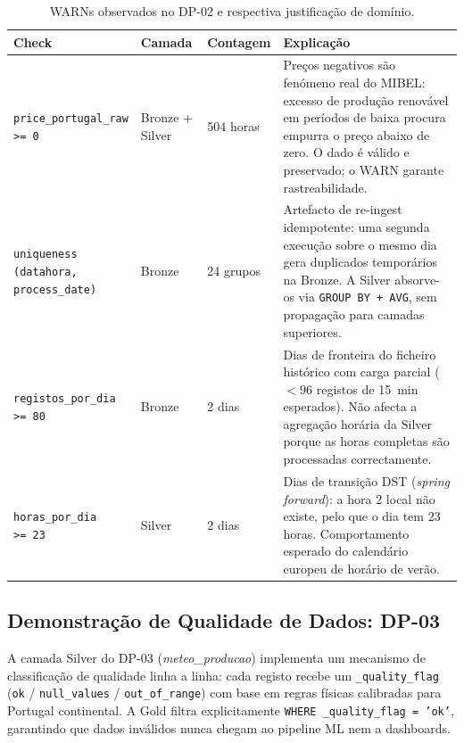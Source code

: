 \documentclass[11pt,a4paper]{article}
\begin{document}
\begin{table}[htbp]
\centering
\scriptsize
\begin{tabular}{p{3.7cm}p{1.8cm}p{1.5cm}p{5.2cm}}
\toprule
\textbf{Check} & \textbf{Camada} & \textbf{Contagem} & \textbf{Explicação} \\
\midrule
\makecell[tl]{\texttt{price\_portugal\_raw}\\\texttt{>= 0}} & Bronze + Silver & 504 horas & Preços negativos são fenómeno real do MIBEL: excesso de produção renovável em períodos de baixa procura empurra o preço abaixo de zero. O dado é válido e preservado; o WARN garante rastreabilidade. \\
\addlinespace
\makecell[tl]{\texttt{uniqueness}\\\texttt{(datahora,}\\\texttt{process\_date)}} & Bronze & 24 grupos & Artefacto de re-ingest idempotente: uma segunda execução sobre o mesmo dia gera duplicados temporários na Bronze. A Silver absorve-os via \texttt{GROUP BY + AVG}, sem propagação para camadas superiores. \\
\addlinespace
\makecell[tl]{\texttt{registos\_por\_dia}\\\texttt{>= 80}} & Bronze & 2 dias & Dias de fronteira do ficheiro histórico com carga parcial ($<96$ registos de 15~min esperados). Não afecta a agregação horária da Silver porque as horas completas são processadas correctamente. \\
\addlinespace
\makecell[tl]{\texttt{horas\_por\_dia}\\\texttt{>= 23}} & Silver & 2 dias & Dias de transição DST (\textit{spring forward}): a hora 2 local não existe, pelo que o dia tem 23 horas. Comportamento esperado do calendário europeu de horário de verão. \\
\bottomrule
\end{tabular}
\caption{WARNs observados no DP-02 e respectiva justificação de domínio.}
\label{tab:warns_dp02}
\end{table}

\subsection{Demonstração de Qualidade de Dados: DP-03}

A camada Silver do DP-03 (\textit{meteo\_producao}) implementa um mecanismo de classificação de qualidade linha a linha: cada registo recebe um \texttt{\_quality\_flag} (\texttt{ok} / \texttt{null\_values} / \texttt{out\_of\_range}) com base em regras físicas calibradas para Portugal continental. A Gold filtra explicitamente \texttt{WHERE \_quality\_flag = 'ok'}, garantindo que dados inválidos nunca chegam ao pipeline ML nem a dashboards.
\end{document}
